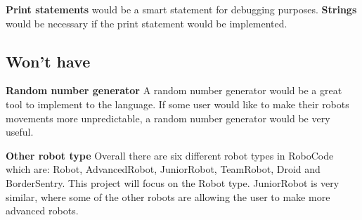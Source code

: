 \textbf{Print statements} would be a smart statement for debugging purposes.
\textbf{Strings} would be necessary if the print statement would be implemented.

\subsection{Won't have} 
\textbf{Random number generator}
A random number generator would be a great tool to implement to the language. If some user would like to make their robots movements more unpredictable, a random number generator would be very useful.

\textbf{Other robot type} 
Overall there are six different robot types in RoboCode which are: Robot, AdvancedRobot, JuniorRobot, TeamRobot, Droid and BorderSentry. This project will focus on the Robot type. JuniorRobot is very similar, where some of the other robots are allowing the user to make more advanced robots. 

 